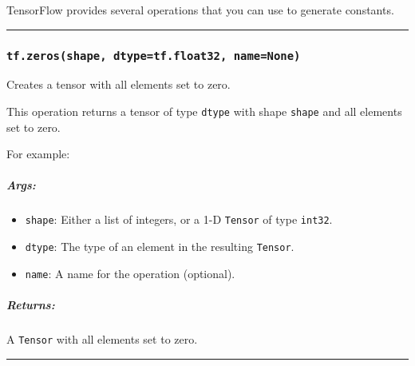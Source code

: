 TensorFlow provides several operations that you can use to generate
constants.

\begin{center}\rule{0.5\linewidth}{\linethickness}\end{center}

\subsubsection{\texorpdfstring{\texttt{tf.zeros(shape,\ dtype=tf.float32,\ name=None)}
}{tf.zeros(shape, dtype=tf.float32, name=None) }}\label{tf.zerosshape-dtypetf.float32-namenone}

Creates a tensor with all elements set to zero.

This operation returns a tensor of type \texttt{dtype} with shape
\texttt{shape} and all elements set to zero.

For example:

\begin{Shaded}
\begin{Highlighting}[]
\NormalTok{tf.zeros([}\NormalTok{, }\NormalTok{], int32) }\OperatorTok{==>} \NormalTok{[[}\NormalTok{, }\NormalTok{, }\NormalTok{, }\NormalTok{], [}\NormalTok{, }\NormalTok{, }\NormalTok{, }\NormalTok{], [}\NormalTok{, }\NormalTok{, }\NormalTok{, }\NormalTok{]]}
\end{Highlighting}
\end{Shaded}

\subparagraph{Args: }\label{args}

\begin{itemize}
\tightlist
\item
  \texttt{shape}: Either a list of integers, or a 1-D \texttt{Tensor} of
  type \texttt{int32}.
\item
  \texttt{dtype}: The type of an element in the resulting
  \texttt{Tensor}.
\item
  \texttt{name}: A name for the operation (optional).
\end{itemize}

\subparagraph{Returns: }\label{returns}

A \texttt{Tensor} with all elements set to zero.

\begin{center}\rule{0.5\linewidth}{\linethickness}\end{center}

